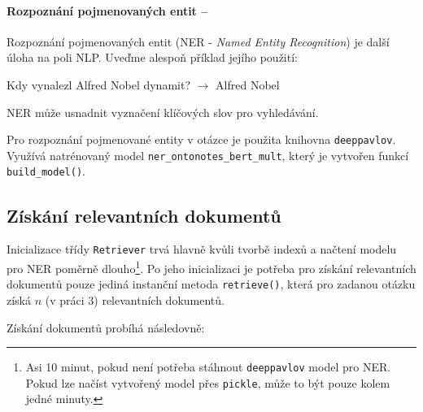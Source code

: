 \paragraph{Rozpoznání pojmenovaných entit --}
Rozpoznání pojmenovaných entit (NER - \emph{Named Entity Recognition}) je další úloha na poli NLP. Uveďme alespoň příklad jejího použití:
\begin{center}
    Kdy vynalezl Alfred Nobel dynamit? $\longrightarrow$ Alfred Nobel
\end{center}
NER může usnadnit vyznačení klíčových slov pro vyhledávání.\par
Pro rozpoznání pojmenované entity v otázce je použita knihovna \texttt{deeppavlov}. Využívá natrénovaný model \texttt{ner\_ontonotes\_bert\_mult}, který je vytvořen funkcí \texttt{build\_model()}.

\subsection{Získání relevantních dokumentů}
Inicializace třídy \texttt{Retriever} trvá hlavně kvůli tvorbě indexů a načtení modelu pro NER poměrně dlouho\footnote{Asi 10 minut, pokud není potřeba stáhnout \texttt{deeppavlov} model pro NER. Pokud lze načíst vytvořený model přes \texttt{pickle}, může to být pouze kolem jedné minuty.}. Po jeho inicializaci je potřeba pro získání relevantních dokumentů pouze jediná instanční metoda \texttt{retrieve()}, která pro zadanou otázku získá $n$ (v práci 3) relevantních dokumentů.\par
Získání dokumentů probíhá následovně:
